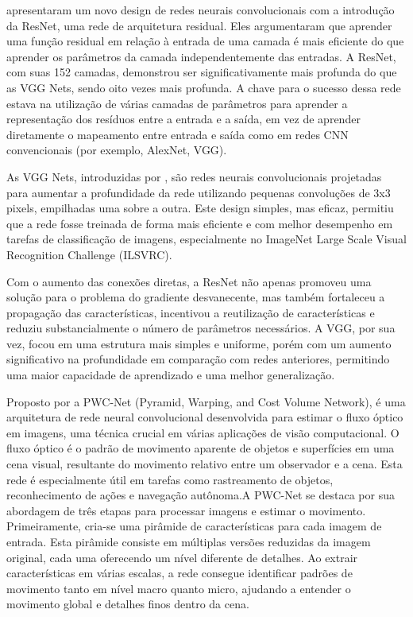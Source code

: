 \textcite{he2015deep} apresentaram um novo design de redes neurais convolucionais com a introdução da ResNet, uma rede de arquitetura residual. Eles argumentaram que aprender uma função residual em relação à entrada de uma camada é mais eficiente do que aprender os parâmetros da camada independentemente das entradas. A ResNet, com suas 152 camadas, demonstrou ser significativamente mais profunda do que as VGG Nets, sendo oito vezes mais profunda. A chave para o sucesso dessa rede estava na utilização de várias camadas de parâmetros para aprender a representação dos resíduos entre a entrada e a saída, em vez de aprender diretamente o mapeamento entre entrada e saída como em redes CNN convencionais (por exemplo, AlexNet, VGG).

As VGG Nets, introduzidas por \textcite{simonyan2015deep}, são redes neurais convolucionais projetadas para aumentar a profundidade da rede utilizando pequenas convoluções de 3x3 pixels, empilhadas uma sobre a outra. Este design simples, mas eficaz, permitiu que a rede fosse treinada de forma mais eficiente e com melhor desempenho em tarefas de classificação de imagens, especialmente no ImageNet Large Scale Visual Recognition Challenge (ILSVRC).

Com o aumento das conexões diretas, a ResNet não apenas promoveu uma solução para o problema do gradiente desvanecente, mas também fortaleceu a propagação das características, incentivou a reutilização de características e reduziu substancialmente o número de parâmetros necessários. A VGG, por sua vez, focou em uma estrutura mais simples e uniforme, porém com um aumento significativo na profundidade em comparação com redes anteriores, permitindo uma maior capacidade de aprendizado e uma melhor generalização.


Proposto por \textcite{https://doi.org/10.48550/arxiv.1709.02371} a PWC-Net (Pyramid, Warping, and Cost Volume Network), é uma  arquitetura de rede neural convolucional desenvolvida para estimar o fluxo óptico em imagens, uma técnica crucial em várias aplicações de visão computacional. O fluxo óptico é o padrão de movimento aparente de objetos e superfícies em uma cena visual, resultante do movimento relativo entre um observador e a cena. Esta rede é especialmente útil em tarefas como rastreamento de objetos, reconhecimento de ações e navegação autônoma.A PWC-Net se destaca por sua abordagem de três etapas para processar imagens e estimar o movimento. Primeiramente, cria-se uma pirâmide de características para cada imagem de entrada. Esta pirâmide consiste em múltiplas versões reduzidas da imagem original, cada uma oferecendo um nível diferente de detalhes. Ao extrair características em várias escalas, a rede consegue identificar padrões de movimento tanto em nível macro quanto micro, ajudando a entender o movimento global e detalhes finos dentro da cena.

